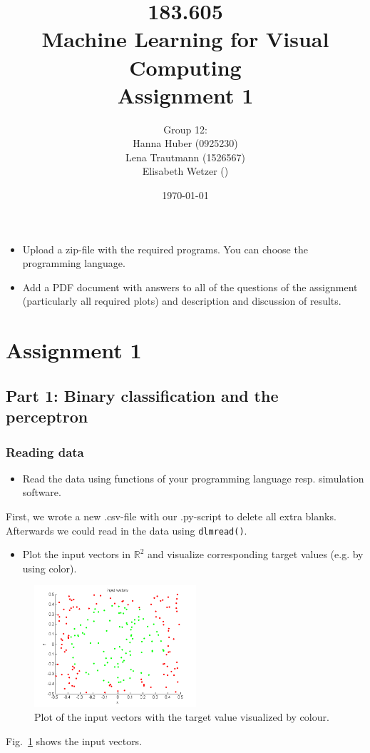 \documentclass[a4]{article}
\title{\bf 183.605 \\ Machine Learning for Visual Computing \\ Assignment 1}
\author{Group 12: \\
	Hanna Huber (0925230) \\ Lena Trautmann (1526567) \\ Elisabeth Wetzer ()}
\date{\today}
\begin{document}
\maketitle
\noindent

\begin{itemize}
\item Upload a zip-file with the required programs. You can choose the programming language.
\item Add a PDF document with answers to all of the questions of the assignment (particularly all required plots) and description and discussion of results. 
\end{itemize}

\section{Assignment 1}
\subsection{Part 1: Binary classification and the perceptron}

\subsubsection{Reading data}\label{sec:readdata}
\begin{itemize}
\item Read the data using functions of your programming language resp. simulation software.
\end{itemize}
First, we wrote a new .csv-file with our .py-script to delete all extra blanks. Afterwards we could read in the data using \texttt{dlmread()}.

\begin{itemize}
\item Plot the input vectors in $\mathbb{R}^2$ and visualize corresponding target values (e.g. by using color). 
\end{itemize}
\begin{figure}[!h]
	\begin{center}
		\centering
		\includegraphics[width=6cm]{figures/inputVectors.pdf}
	\end{center}	
	\caption{Plot of the input vectors with the target value visualized by colour.}
	\label{fig:inputVectors}
\end{figure}
Fig.~\ref{fig:inputVectors} shows the input vectors.
\end{document}
